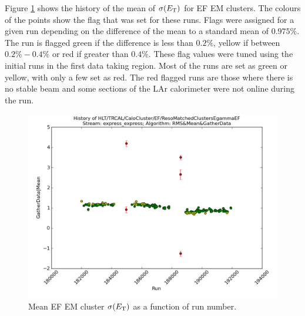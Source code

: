 Figure \ref{SW_egamma_EF_Reso_Range} shows the history of the mean of $\sigma(\mbox{$E_{\rm T}$}{})$ for EF EM clusters.
The colours of the points show the flag that was set for these runs.
Flags were assigned for a given run depending on the difference of the mean to a standard mean of $0.975\%$. 
The run is flagged green if the difference is less than $0.2\%$, yellow if between $0.2\% - 0.4\%$ or red if greater than $0.4\%$.
These flag values were tuned using the initial runs in the first data taking region.
Most of the runs are set as green or yellow, with only a few set as red.
The red flagged runs are those where there is no stable beam and some sections of the LAr calorimeter were not online during the run.


\begin{figure}
\centering
\includegraphics[width=1.0\textwidth]{figures/ServiceWork/EF_Reso_Range.pdf}
\caption[Mean EF EM cluster \et{} resolution as a function of run number]{
Mean EF EM cluster $\sigma(\mbox{$E_{\rm T}$}{})$ as a function of run number. 
\label{SW_egamma_EF_Reso_Range}}
\end{figure}

